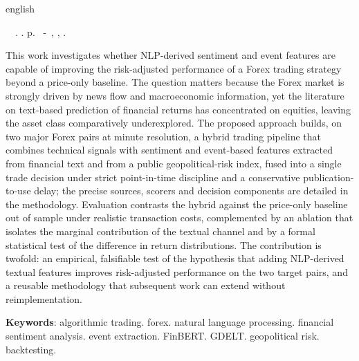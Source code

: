 \begin{resumo}[Abstract]
 \begin{otherlanguage*}{english}
    \begin{flushleft}
        \setlength{\absparsep}{0pt}
        \SingleSpacing  		\imprimirautorabr~~\textbf{\imprimirtitleabstract}.	\imprimirdata.  \pageref{LastPage} p.
        \imprimirtipotrabalhoabs~-~\imprimirinstituicao, \imprimirlocal, 	\imprimirdata.
    \end{flushleft}
    \OnehalfSpacing
   This work investigates whether NLP-derived sentiment and event features are capable of improving the risk-adjusted performance of a Forex trading strategy beyond a price-only baseline. The question matters because the Forex market is strongly driven by news flow and macroeconomic information, yet the literature on text-based prediction of financial returns has concentrated on equities, leaving the asset class comparatively underexplored. The proposed approach builds, on two major Forex pairs at minute resolution, a hybrid trading pipeline that combines technical signals with sentiment and event-based features extracted from financial text and from a public geopolitical-risk index, fused into a single trade decision under strict point-in-time discipline and a conservative publication-to-use delay; the precise sources, scorers and decision components are detailed in the methodology. Evaluation contrasts the hybrid against the price-only baseline out of sample under realistic transaction costs, complemented by an ablation that isolates the marginal contribution of the textual channel and by a formal statistical test of the difference in return distributions. The contribution is twofold: an empirical, falsifiable test of the hypothesis that adding NLP-derived textual features improves risk-adjusted performance on the two target pairs, and a reusable methodology that subsequent work can extend without reimplementation.

   \vspace{\onelineskip}

   \noindent
   \textbf{Keywords}: algorithmic trading. forex. natural language processing. financial sentiment analysis. event extraction. FinBERT. GDELT. geopolitical risk. backtesting.
 \end{otherlanguage*}
\end{resumo}
